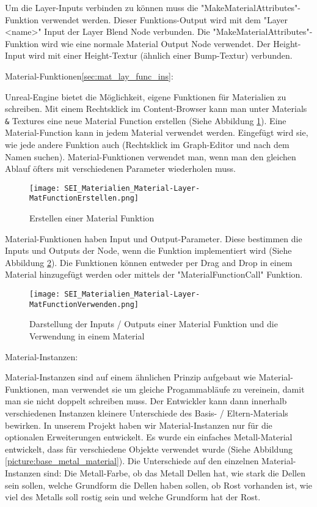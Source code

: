 Um die Layer-Inputs verbinden zu können muss die "MakeMaterialAttributes"-Funktion verwendet werden. Dieser
Funktions-Output wird mit dem "Layer <name>" Input der Layer Blend Node verbunden. Die
"MakeMaterialAttributes"-Funktion wird wie eine normale Material Output Node verwendet. Der Height-Input wird mit einer
Height-Textur (ähnlich einer Bump-Textur) verbunden.

Material-Funktionen\ref{sec:mat_lay_func_ins}:

Unreal-Engine bietet die Möglichkeit, eigene Funktionen für Materialien zu schreiben. Mit einem Rechtsklick im
Content-Browser kann man unter Materials \verb-&- Textures eine neue Material Function erstellen (Siehe
Abbildung \ref{picture:make_mat_func}). Eine Material-Function kann in jedem Material verwendet werden. Eingefügt wird sie, wie jede andere
Funktion auch (Rechtsklick im Graph-Editor und nach dem Namen suchen). Material-Funktionen verwendet man, wenn man
den gleichen Ablauf öfters mit verschiedenen Parameter wiederholen muss.

\begin{figure}[H]
    \centering
    \texttt{[image: SEI\_Materialien\_Material-Layer-MatFunctionErstellen.png]}
    \caption{Erstellen einer Material Funktion}
    \label{picture:make_mat_func}
\end{figure}

Material-Funktionen haben Input und Output-Parameter. Diese bestimmen die Inputs und Outputs der Node, wenn die
Funktion implementiert wird (Siehe Abbildung \ref{picture:use_mat_func}). Die Funktionen können entweder per Drag and
Drop in einem Material hinzugefügt werden oder mittels der "MaterialFunctionCall" Funktion.

\begin{figure}[H]
    \centering
    \texttt{[image: SEI\_Materialien\_Material-Layer-MatFunctionVerwenden.png]}
    \caption{Darstellung der Inputs / Outputs einer Material Funktion und die Verwendung in einem Material}
    \label{picture:use_mat_func}
\end{figure}

Material-Instanzen\citep{ue:mat_instances}:

Material-Instanzen sind auf einem ähnlichen Prinzip aufgebaut wie Material-Funktionen, man verwendet sie um gleiche
Progammabläufe zu vereinein, damit man sie nicht doppelt schreiben muss. Der Entwickler kann dann innerhalb
verschiedenen Instanzen kleinere Unterschiede des Basis- / Eltern-Materials bewirken. In unserem Projekt haben wir
Material-Instanzen nur für die optionalen Erweiterungen entwickelt. Es wurde ein einfaches Metall-Material entwickelt,
dass für verschiedene Objekte verwendet wurde (Siehe Abbildung \ref{picture:base_metal_material}). Die Unterschiede auf
den einzelnen Material-Instanzen sind: Die Metall-Farbe, ob das Metall Dellen hat, wie stark die Dellen sein sollen,
welche Grundform die Dellen haben sollen, ob Rost vorhanden ist, wie viel des Metalls soll rostig sein und welche
Grundform hat der Rost.


